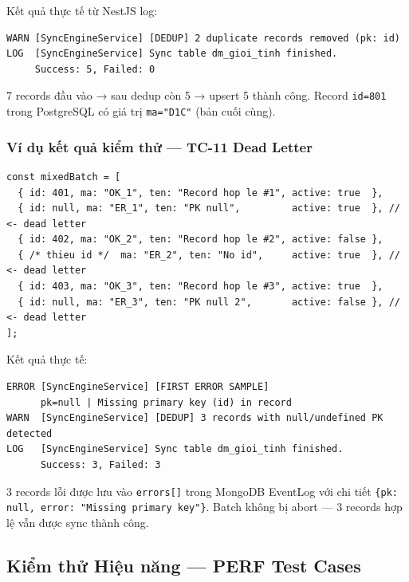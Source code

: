Kết quả thực tế từ NestJS log:

\begin{verbatim}
WARN [SyncEngineService] [DEDUP] 2 duplicate records removed (pk: id)
LOG  [SyncEngineService] Sync table dm_gioi_tinh finished.
     Success: 5, Failed: 0
\end{verbatim}

7 records đầu vào → sau dedup còn 5 → upsert 5 thành công. Record
\texttt{id=801} trong PostgreSQL có giá trị \texttt{ma="D1C"} (bản
cuối cùng).

\subsubsection{Ví dụ kết quả kiểm thử — TC-11 Dead Letter}

\begin{lstlisting}[caption={Payload TC-11: mix records hợp lệ và thiếu PK},
  label={lst:tc11-payload}]
const mixedBatch = [
  { id: 401, ma: "OK_1", ten: "Record hop le #1", active: true  },
  { id: null, ma: "ER_1", ten: "PK null",         active: true  }, // <- dead letter
  { id: 402, ma: "OK_2", ten: "Record hop le #2", active: false },
  { /* thieu id */  ma: "ER_2", ten: "No id",     active: true  }, // <- dead letter
  { id: 403, ma: "OK_3", ten: "Record hop le #3", active: true  },
  { id: null, ma: "ER_3", ten: "PK null 2",       active: false }, // <- dead letter
];
\end{lstlisting}

Kết quả thực tế:

\begin{verbatim}
ERROR [SyncEngineService] [FIRST ERROR SAMPLE]
      pk=null | Missing primary key (id) in record
WARN  [SyncEngineService] [DEDUP] 3 records with null/undefined PK detected
LOG   [SyncEngineService] Sync table dm_gioi_tinh finished.
      Success: 3, Failed: 3
\end{verbatim}

3 records lỗi được lưu vào \texttt{errors[]} trong MongoDB EventLog
với chi tiết \texttt{\{pk: null, error: "Missing primary key"\}}.
Batch không bị abort — 3 records hợp lệ vẫn được sync thành công.

\subsection{Kiểm thử Hiệu năng — PERF Test Cases}
\label{sec:perf-ram}

